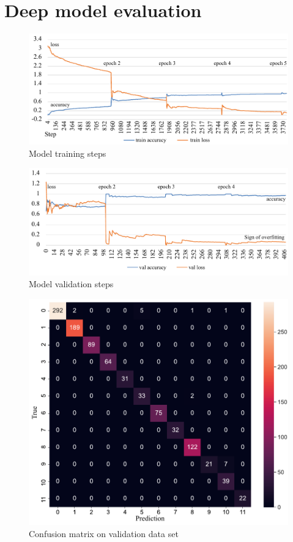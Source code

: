 \section{Deep model evaluation}
\label{sec:Deep model evaluation}

\begin{figure}[!ht]
    \centering
    \includegraphics[width=\textwidth]{evaluation/imgs/5-train-step.pdf}
    \caption{Model training steps}
    \label{fig:5-train-step}
\end{figure}

\begin{figure}[!ht]
    \centering
    \includegraphics[width=\textwidth]{evaluation/imgs/5-val-steps.pdf}
    \caption{Model validation steps}
    \label{fig:5-val-steps}
\end{figure}

\begin{figure}[!ht]
    \centering
    \includegraphics[width=.85\textwidth]{evaluation/imgs/5-confusion_matrix_val.pdf}
    \caption{Confusion matrix on validation data set}
    \label{fig:5-confusion_matrix_val}
\end{figure}

